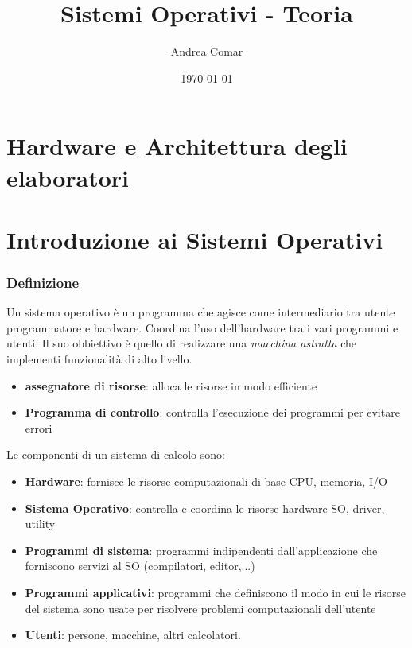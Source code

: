 \documentclass{article}
\title{Sistemi Operativi - Teoria}
\author{Andrea Comar}
\date{\today}
\begin{document}
\maketitle
\newpage
\tableofcontents
\newpage
\part{Hardware e Architettura degli elaboratori}
\part{Introduzione ai Sistemi Operativi} %
\section{Definizione}
Un sistema operativo è un programma che agisce come intermediario tra utente programmatore e hardware. 
Coordina l'uso dell'hardware tra i vari programmi e utenti.
Il suo obbiettivo è quello di realizzare una \textit{macchina astratta} che implementi funzionalità di alto livello.
\begin{itemize}
    \item \textbf{assegnatore di risorse}: alloca le risorse in modo efficiente
    \item \textbf{Programma di controllo}: controlla l'esecuzione dei programmi per evitare errori
\end{itemize}

Le componenti di un sistema di calcolo sono:
\begin{itemize}
    \item \textbf{Hardware}: fornisce le risorse computazionali di base CPU, memoria, I/O
    \item \textbf{Sistema Operativo}: controlla e coordina le risorse hardware SO, driver, utility
    \item \textbf{Programmi di sistema}: programmi indipendenti dall'applicazione che forniscono servizi al SO (compilatori, editor,...)
    \item \textbf{Programmi applicativi}: programmi che definiscono il modo in cui le risorse del sistema sono usate per risolvere problemi computazionali dell'utente
    \item \textbf{Utenti}: persone, macchine, altri calcolatori.
\end{itemize}
\end{document}

